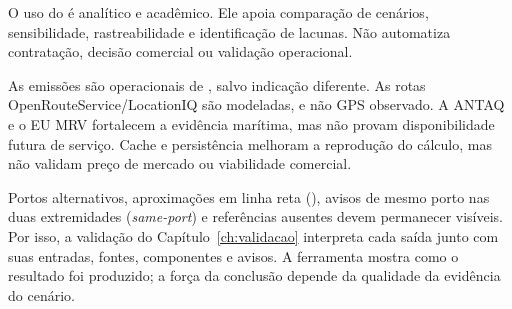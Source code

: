 O uso do \CabotageLens{} é analítico e acadêmico. Ele apoia comparação de cenários, sensibilidade, rastreabilidade e identificação de lacunas. Não automatiza contratação, decisão comercial ou validação operacional.

As emissões são operacionais \ttw{} de \cooe{}, salvo indicação diferente. As rotas OpenRouteService/LocationIQ são modeladas, e não GPS observado. A ANTAQ e o EU MRV fortalecem a evidência marítima, mas não provam disponibilidade futura de serviço. Cache e persistência melhoram a reprodução do cálculo, mas não validam preço de mercado ou viabilidade comercial.

Portos alternativos, aproximações em linha reta (), avisos de mesmo porto nas duas extremidades (\emph{same-port}) e referências ausentes devem permanecer visíveis. Por isso, a validação do Capítulo~\ref{ch:validacao} interpreta cada saída junto com suas entradas, fontes, componentes e avisos. A ferramenta mostra como o resultado foi produzido; a força da conclusão depende da qualidade da evidência do cenário.
